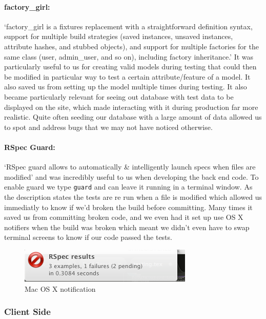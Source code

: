     \paragraph{factory\_girl:}
      `factory\_girl is a fixtures replacement with a straightforward definition syntax, support for multiple build strategies (saved instances, unsaved instances, attribute hashes, and stubbed objects), and support for multiple factories for the same class (user, admin\_user, and so on), including factory inheritance.'\cite{factory-girl} It was particularly useful to us for creating valid models during testing that could then be modified in particular way to test a certain attribute/feature of a model.
      It also saved us from setting up the model multiple times during testing.
      It also became particularly relevant for seeing out database with test data to be displayed on the site, which made interacting with it during production far more realistic. Quite often seeding our database with a large amount of data allowed us to spot and address bugs that we may not have noticed otherwise.

    \paragraph{RSpec Guard:}
      `RSpec guard allows to automatically \& intelligently launch specs when files are modified'\cite{guard} and was incredibly useful to us when developing the back end code. To enable guard we type \verb!guard! and can leave it running in a terminal window. As the description states the tests are re run when a file is modified which allowed us immediatly to know if we'd broken the build before committing.
      Many times it saved us from committing broken code, and we even had it set up use OS X notifiers when the build was broken which meant we didn't even have to swap terminal screens to know if our code passed the tests.

      \begin{figure}[H]\centering
      \includegraphics[scale=0.5]{images/project_management/testing/guard_osx}
      \caption{Mac OS X notification}
      \end{figure}

  \subsubsection{Client Side}
